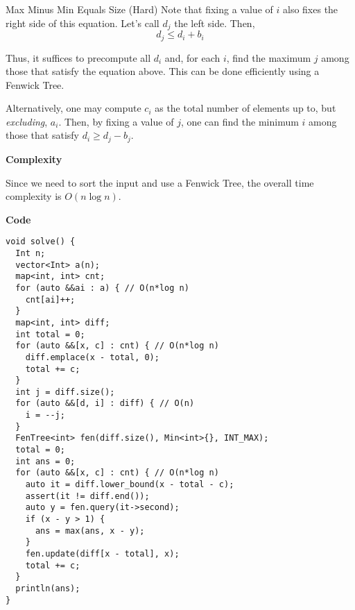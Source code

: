 \documentclass [11pt, a4paper] {article}
\begin{document}
\begin{tutorial}{Max Minus Min Equals Size (Hard)}
  Note that fixing a value of $i$ also fixes the right side of this equation. Let's call $d_j$ the left side. Then, $$ d_j \le d_i + b_i $$
  
  Thus, it suffices to precompute all $d_i$ and, for each $i$, find the maximum $j$ among those that satisfy the equation above. This can be done efficiently using a Fenwick Tree.
  
  Alternatively, one may compute $c_i$ as the total number of elements up to, but \textit{excluding}, $a_i$. Then, by fixing a value of $j$, one can find the minimum $i$ among those that satisfy $d_i \ge d_j - b_j$.
  
  \textbf{Complexity}
  
  Since we need to sort the input and use a Fenwick Tree, the overall time complexity is $O(n \log n)$.
  
  \textbf{Code}
  
  \begin{lstlisting}
void solve() {
  Int n;
  vector<Int> a(n);
  map<int, int> cnt;
  for (auto &&ai : a) { // O(n*log n)
    cnt[ai]++;
  }
  map<int, int> diff;
  int total = 0;
  for (auto &&[x, c] : cnt) { // O(n*log n)
    diff.emplace(x - total, 0);
    total += c;
  }
  int j = diff.size();
  for (auto &&[d, i] : diff) { // O(n)
    i = --j;
  }
  FenTree<int> fen(diff.size(), Min<int>{}, INT_MAX);
  total = 0;
  int ans = 0;
  for (auto &&[x, c] : cnt) { // O(n*log n)
    auto it = diff.lower_bound(x - total - c);
    assert(it != diff.end());
    auto y = fen.query(it->second);
    if (x - y > 1) {
      ans = max(ans, x - y);
    }
    fen.update(diff[x - total], x);
    total += c;
  }
  println(ans);
}
\end{lstlisting}
  
\end{tutorial}
\end{document}
